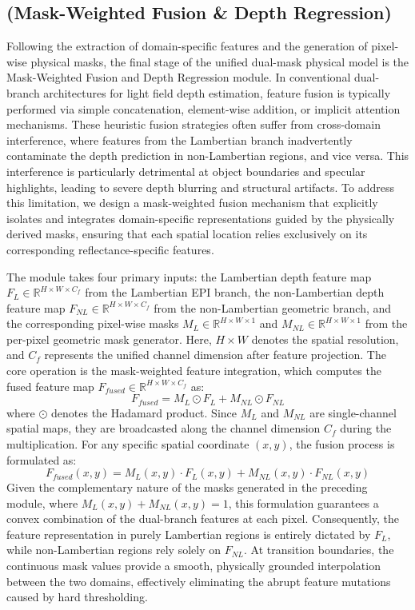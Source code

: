 \subsection{(Mask-Weighted Fusion \& Depth Regression)}

Following the extraction of domain-specific features and the generation of pixel-wise physical masks, the final stage of the unified dual-mask physical model is the Mask-Weighted Fusion and Depth Regression module. In conventional dual-branch architectures for light field depth estimation, feature fusion is typically performed via simple concatenation, element-wise addition, or implicit attention mechanisms. These heuristic fusion strategies often suffer from cross-domain interference, where features from the Lambertian branch inadvertently contaminate the depth prediction in non-Lambertian regions, and vice versa. This interference is particularly detrimental at object boundaries and specular highlights, leading to severe depth blurring and structural artifacts. To address this limitation, we design a mask-weighted fusion mechanism that explicitly isolates and integrates domain-specific representations guided by the physically derived masks, ensuring that each spatial location relies exclusively on its corresponding reflectance-specific features.

The module takes four primary inputs: the Lambertian depth feature map $F_L \in \mathbb{R}^{H \times W \times C_f}$ from the Lambertian EPI branch, the non-Lambertian depth feature map $F_{NL} \in \mathbb{R}^{H \times W \times C_f}$ from the non-Lambertian geometric branch, and the corresponding pixel-wise masks $M_L \in \mathbb{R}^{H \times W \times 1}$ and $M_{NL} \in \mathbb{R}^{H \times W \times 1}$ from the per-pixel geometric mask generator. Here, $H \times W$ denotes the spatial resolution, and $C_f$ represents the unified channel dimension after feature projection. The core operation is the mask-weighted feature integration, which computes the fused feature map $F_{fused} \in \mathbb{R}^{H \times W \times C_f}$ as:
\begin{equation}
\label{eq:eq21}
F_{fused} = M_L \odot F_L + M_{NL} \odot F_{NL}
\end{equation}
where $\odot$ denotes the Hadamard product. Since $M_L$ and $M_{NL}$ are single-channel spatial maps, they are broadcasted along the channel dimension $C_f$ during the multiplication. For any specific spatial coordinate $(x, y)$, the fusion process is formulated as:
\begin{equation}
\label{eq:eq22}
F_{fused}(x,y) = M_L(x,y) \cdot F_L(x,y) + M_{NL}(x,y) \cdot F_{NL}(x,y)
\end{equation}
Given the complementary nature of the masks generated in the preceding module, where $M_L(x,y) + M_{NL}(x,y) = 1$, this formulation guarantees a convex combination of the dual-branch features at each pixel. Consequently, the feature representation in purely Lambertian regions is entirely dictated by $F_L$, while non-Lambertian regions rely solely on $F_{NL}$. At transition boundaries, the continuous mask values provide a smooth, physically grounded interpolation between the two domains, effectively eliminating the abrupt feature mutations caused by hard thresholding.

